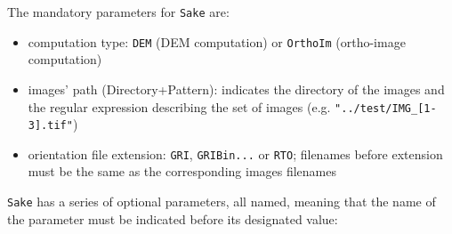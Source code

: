 The mandatory parameters for {\tt Sake} are:
\begin{itemize}
  \item computation type: {\tt DEM} (DEM computation) or {\tt OrthoIm} (ortho-image computation)
  \item images' path (Directory+Pattern): indicates the directory of the images and the regular expression describing the set of images (e.g. {\tt "../test/IMG\_[1-3].tif"})
  \item orientation file extension: {\tt GRI}, {\tt GRIBin...} or {\tt RTO}; filenames before extension must be the same as the corresponding images filenames
\end{itemize}

\vspace{0.3cm}
{\tt Sake} has a series of optional parameters, all named, meaning that the name of the parameter must be indicated before its designated value:
